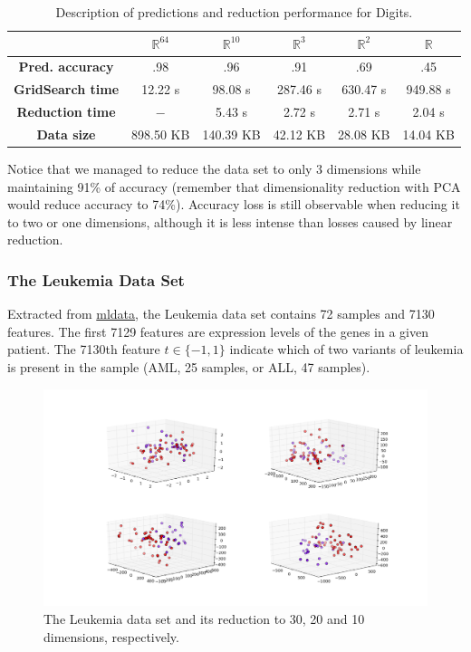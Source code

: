 \documentclass[12pt]{article}
\begin{document}
\begin{table}[H]
	\centering
	\begin{tabular}{|c|c|c|c|c|c|}
		\hline
		& \textbf{$\mathbb{R}^{64}$} & \textbf{$\mathbb{R}^{10}$} & \textbf{$\mathbb{R}^3$} & \textbf{$\mathbb{R}^2$} & \textbf{$\mathbb{R}$} \\\hline
		\textbf{Pred. accuracy}   & .98 & .96 & .91 & .69 & .45 \\\hline
		\textbf{GridSearch time} & 12.22 s & 98.08 s & 287.46 s & 630.47 s & 949.88 s \\\hline
		\textbf{Reduction time}  & $-$ & 5.43 s & 2.72 s & 2.71 s & 2.04 s \\\hline
		\textbf{Data size} & 898.50 KB & 140.39 KB & 42.12 KB & 28.08 KB & 14.04 KB \\\hline
	\end{tabular}

	\caption{Description of predictions and reduction performance for Digits.}
\end{table}

Notice that we managed to reduce the data set to only 3 dimensions while maintaining 91\% of accuracy (remember that dimensionality reduction with PCA would reduce accuracy to 74\%). Accuracy loss is still observable when reducing it to two or one dimensions, although it is less intense than losses caused by linear reduction.

\subsubsection{The Leukemia Data Set}

Extracted from \href{http://mldata.com}{mldata}, the Leukemia data set contains 72 samples and 7130 features. The first 7129 features are expression levels of the genes in a given patient. The 7130th feature $t \in \{-1, 1\}$ indicate which of two variants of leukemia is present in the sample (AML, 25 samples, or ALL, 47 samples). \cite{on:duc_ds}

\begin{figure}[H]
	\centering
	\includegraphics[width=\linewidth]{img/experiments/leukemia}
	\captionsetup{justification=centering}
	\caption{The Leukemia data set and its reduction to 30, 20 and 10 dimensions, respectively.}
	\label{fig:leukemiads}
\end{figure}
\end{document}
